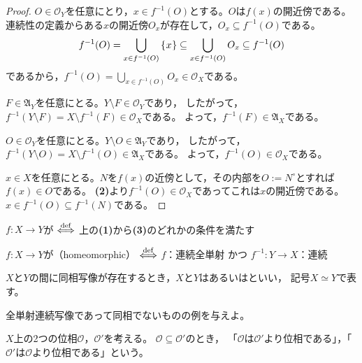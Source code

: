 \documentclass[uplatex]{jsarticle}
\begin{document}
\begin{proof}
   $O \in \mathcal{O}_{Y}$を任意にとり，$x \in f^{-1}(O)$とする。$O$は$f(x)$の開近傍である。
  連続性の定義からある$x$の開近傍$O_{x}$が存在して，$O_{x} \subseteq f^{-1} (O)$である。
  \begin{equation}
    f^{-1} (O) = \bigcup_{x \in f^{-1}(O)} \Set{\hspace{-1.8pt} x \hspace{-1.8pt}} \subseteq \bigcup_{x \in f^{-1}(O)} O_{x} \subseteq f^{-1}(O)
  \end{equation}
  であるから，${\displaystyle f^{-1}(O) = \bigcup_{x \in f^{-1} (O)} O_{x} \in \mathcal{O}_{X}}$である。

   $F \in \mathfrak{A}_{Y}$を任意にとる。$Y \setminus F \in \mathcal{O}_{Y}$であり，
  したがって，$f^{-1} (Y \setminus F) = X \setminus f^{-1}(F) \in \mathcal{O}_{X}$である。
  よって，$f^{-1} (F) \in \mathfrak{A}_{X}$である。

   $O \in \mathcal{O}_{Y}$を任意にとる。$Y \setminus O \in \mathfrak{A}_{Y}$であり，
  したがって，$f^{-1} (Y \setminus O) = X \setminus f^{-1} (O) \in \mathfrak{A}_{X}$である。
  よって，$f^{-1} (O) \in \mathcal{O}_{X}$である。

   $x \in X$を任意にとる。$N$を$f(x)$の近傍として，その内部を$O := N^{\circ}$とすれば$f(x) \in O$である。
  {\bf (2)}より$f^{-1}(O) \in \mathcal{O}_{X}$であってこれは$x$の開近傍である。
  $x \in f^{-1} (O) \subseteq f^{-1} (N)$である。
\end{proof}

\begin{teigi}[同相]
   $f \colon X \longrightarrow Y$が $\overset{\mathrm{def}}{\Longleftrightarrow}$ 上の{\bf (1)}から{\bf (3)}のどれかの条件を満たす
  
   $f \colon X \longrightarrow Y$が（homeomorphic） $\overset{\mathrm{def}}{\Longleftrightarrow}$ $f$：連続全単射 かつ $f^{-1} \colon Y \longrightarrow X$：連続
  
  $X$と$Y$の間に同相写像が存在するとき，$X$と$Y$はあるいはといい，
  記号$X \simeq Y$で表す。
\end{teigi}

全単射連続写像であって同相でないものの例を与えよ。

\begin{teigi}[位相の強弱]
  $X$上の2つの位相$\mathcal{O}$，$\mathcal{O}'$を考える。
  $\mathcal{O} \subseteq \mathcal{O}'$のとき，
  「$\mathcal{O}$は$\mathcal{O}'$より位相である」，「$\mathcal{O}'$は$\mathcal{O}$より位相である」という。
\end{teigi}
\end{document}

